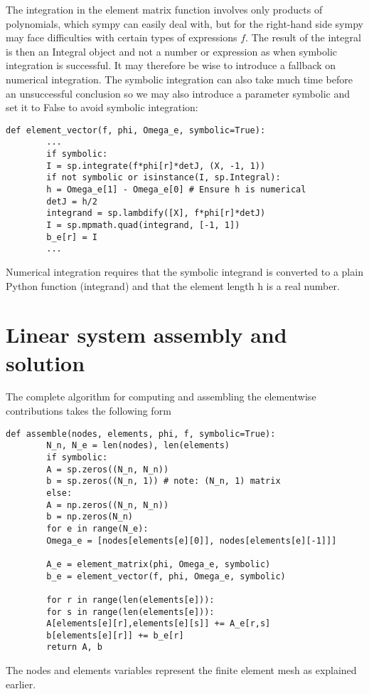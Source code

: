 \documentclass[../main.tex]{subfiles}
\begin{document}
	The integration in the element matrix function involves only products of polynomials, which sympy can easily deal with, but for the right-hand side sympy may face difficulties with certain types of expressions $f$. The result of the integral is then an Integral object and not a number or expression as when symbolic integration is successful. It may therefore be wise to introduce a fallback on numerical integration. The symbolic integration can also take much time before an unsuccessful conclusion so we may also introduce a parameter symbolic and set it to False to avoid symbolic integration:
	\begin{lstlisting}[numbers=none]
		def element_vector(f, phi, Omega_e, symbolic=True):
		...
		if symbolic:
		I = sp.integrate(f*phi[r]*detJ, (X, -1, 1))
		if not symbolic or isinstance(I, sp.Integral):
		h = Omega_e[1] - Omega_e[0] # Ensure h is numerical
		detJ = h/2
		integrand = sp.lambdify([X], f*phi[r]*detJ)
		I = sp.mpmath.quad(integrand, [-1, 1])
		b_e[r] = I
		...
	\end{lstlisting}
	Numerical integration requires that the symbolic integrand is converted to a plain
	Python function (integrand) and that the element length h is a real number.
	\section[Linear system assembly and solution]{Linear system assembly and solution}
	\label{sec:sec_4_2}
	The complete algorithm for computing and assembling the elementwise contributions takes the following form
	\begin{lstlisting}[numbers=none]
		def assemble(nodes, elements, phi, f, symbolic=True):
		N_n, N_e = len(nodes), len(elements)
		if symbolic:
		A = sp.zeros((N_n, N_n))
		b = sp.zeros((N_n, 1)) # note: (N_n, 1) matrix
		else:
		A = np.zeros((N_n, N_n))
		b = np.zeros(N_n)
		for e in range(N_e):
		Omega_e = [nodes[elements[e][0]], nodes[elements[e][-1]]]
		
		A_e = element_matrix(phi, Omega_e, symbolic)
		b_e = element_vector(f, phi, Omega_e, symbolic)
		
		for r in range(len(elements[e])):
		for s in range(len(elements[e])):
		A[elements[e][r],elements[e][s]] += A_e[r,s]
		b[elements[e][r]] += b_e[r]
		return A, b	
	\end{lstlisting}
	The nodes and elements variables represent the finite element mesh as explained earlier.
	
\end{document}

